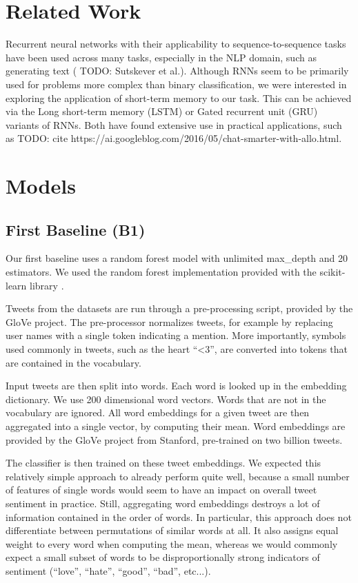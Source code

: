 \documentclass[10pt,conference,compsocconf]{IEEEtran}
\newcommand{\todo}[1]{}
\renewcommand{\todo}[1]{{\color{red} TODO: {#1}}}
\begin{document}
\section{Related Work}

Recurrent neural networks with their applicability to
sequence-to-sequence tasks have been used across many tasks,
especially in the NLP domain, such as generating text (\todo{Sutskever
  et al.}). Although RNNs seem to be primarily used for problems more
complex than binary classification, we were interested in exploring
the application of short-term memory to our task. This can be achieved
via the Long short-term memory (LSTM) or Gated recurrent unit (GRU)
variants of RNNs. Both have found extensive use in practical
applications, such as \todo{cite
  https://ai.googleblog.com/2016/05/chat-smarter-with-allo.html}.

\section{Models}

\subsection{First Baseline (B1)}

Our first baseline uses a random forest model with unlimited
max\_depth and 20 estimators. We used the random forest implementation
provided with the scikit-learn library \cite{scikit-learn}.

Tweets from the datasets are run through a pre-processing script,
provided by the GloVe project. The pre-processor normalizes tweets,
for example by replacing user names with a single token indicating a
mention. More importantly, symbols used commonly in tweets, such as
the heart ``<3'', are converted into tokens that are contained in the
vocabulary.

Input tweets are then split into words. Each word is looked up in the
embedding dictionary. We use 200 dimensional word vectors. Words that
are not in the vocabulary are ignored. All word embeddings for a given
tweet are then aggregated into a single vector, by computing their
mean. Word embeddings are provided by the GloVe \cite{glove} project
from Stanford, pre-trained on two billion tweets.

The classifier is then trained on these tweet embeddings. We expected
this relatively simple approach to already perform quite well, because
a small number of features of single words would seem to have an
impact on overall tweet sentiment in practice. Still, aggregating word
embeddings destroys a lot of information contained in the order of
words. In particular, this approach does not differentiate between
permutations of similar words at all. It also assigns equal weight to
every word when computing the mean, whereas we would commonly expect a
small subset of words to be disproportionally strong indicators of
sentiment (``love'', ``hate'', ``good'', ``bad'', etc...).
\end{document}
